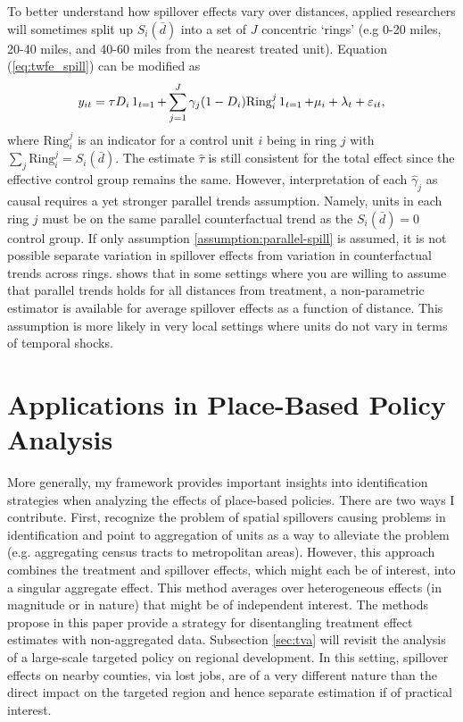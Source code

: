 To better understand how spillover effects vary over distances, applied researchers will sometimes split up $S_i(\bar{d})$ into a set of $J$ concentric `rings' (e.g 0-20 miles, 20-40 miles, and 40-60 miles from the nearest treated unit). Equation (\ref{eq:twfe_spill}) can be modified as 
\begin{equation}\label{eq:twfe_rings}    
  y_{it} = \tau D_i \one_{t = 1} + \sum_{j=1}^J \gamma_j (1 - D_i) \text{Ring}_i^j \one_{t = 1}  + \mu_i + \lambda_t + \varepsilon_{it},
\end{equation}
where $\text{Ring}_i^j$ is an indicator for a control unit $i$ being in ring $j$ with $\sum_j \text{Ring}_{i}^j = S_i(\bar{d})$. The estimate $\hat{\tau}$ is still consistent for the total effect since the effective control group remains the same. However, interpretation of each $\hat{\gamma}_j$ as causal requires a yet stronger parallel trends assumption. Namely, units in each ring $j$ must be on the same parallel counterfactual trend as the $S_i(\bar{d}) = 0$ control group. If only assumption \ref{assumption:parallel-spill} is assumed, it is not possible separate variation in spillover effects from variation in counterfactual trends across rings. \citet{butts2023jue} shows that in some settings where you are willing to assume that parallel trends holds for all distances from treatment, a non-parametric estimator is available for average spillover effects as a function of distance. This assumption is more likely in very local settings where units do not vary in terms of temporal shocks.

\section{Applications in Place-Based Policy Analysis}

More generally, my framework provides important insights into identification strategies when analyzing the effects of place-based policies. There are two ways I contribute. First, \citet{Baum-Snow_Ferreira_2015} recognize the problem of spatial spillovers causing problems in identification and point to aggregation of units as a way to alleviate the problem (e.g. aggregating census tracts to metropolitan areas). However, this approach combines the treatment and spillover effects, which might each be of interest, into a singular aggregate effect. This method averages over heterogeneous effects (in magnitude or in nature) that might be of independent interest. The methods propose in this paper provide a strategy for disentangling treatment effect estimates with non-aggregated data. Subsection \ref{sec:tva} will revisit the analysis of a large-scale targeted policy on regional development. In this setting, spillover effects on nearby counties, via lost jobs, are of a very different nature than the direct impact on the targeted region and hence separate estimation if of practical interest. 

